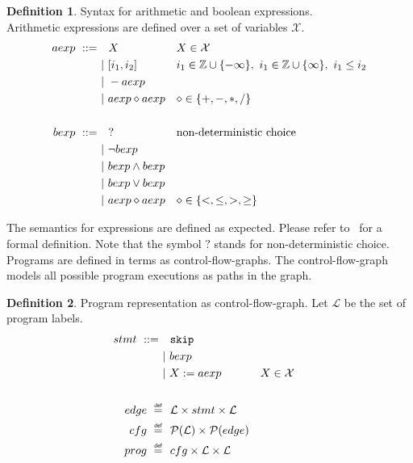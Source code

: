 \documentclass[11pt,a4paper,titlepage]{article}
\theoremstyle{definition}
\newtheorem{definition}{Definition}[section]
\newcommand\eqdef{\mathrel{\overset{\makebox[0pt]{\mbox{\normalfont\tiny\sffamily def}}}{=}}}
\begin{document}
\begin{definition}\label{def:arith_bool_syntax}
    Syntax for arithmetic and boolean expressions. \\
    Arithmetic expressions are defined over a set of variables $\mathcal{X}$.
    \begin{align*}
        \setlength{\jot}{15pt}
        aexp \ ::= \ & \ \ X && X \in \mathcal{X} \\
        &| \  [i_1, i_2] && i_1 \in \mathbb{Z} \cup \{ -\infty \},\ i_1 \in \mathbb{Z} \cup \{\infty \},\ i_1 \leq i_2  \\
        &| \  - aexp \\
        &| \  aexp \diamond aexp && \diamond \in \{ +, -, *, / \}\\
        \\
        bexp \ ::= \ & \ \ ?  && \text{non-deterministic choice} \\
        &| \  \neg bexp \\
        &| \  bexp \land bexp \\
        &| \  bexp \lor bexp \\
        &| \  aexp \diamond aexp && \diamond \in \{<, \leq, >, \geq \}\\
    \end{align*}
\end{definition}

The semantics for expressions are defined as expected. 
Please refer to~\cite{UrbanPhd} for a formal definition. 
Note that the symbol $?$ stands for non-deterministic choice.\\

Programs are defined in terms as control-flow-graphs. The control-flow-graph models all possible program executions as
paths in the graph.

\begin{definition}\label{def:control_flow_graph}
    Program representation as control-flow-graph. 
    Let $\mathcal{L}$ be the set of program labels.
    \begin{align*}
        \setlength{\jot}{15pt}
        stmt \ ::= \ & \ \ \mathtt{skip} \\
        &| \ bexp \\
        &| \ X := aexp  && X \in \mathcal{X} \\
        \\
        edge \ \eqdef & \ \ \mathcal{L} \times stmt \times \mathcal{L}\\
        cfg \ \eqdef & \ \ \mathcal{P}(\mathcal{L}) \times \mathcal{P}(edge)\\
        prog \ \eqdef & \ \ cfg \times \mathcal{L} \times \mathcal{L}
    \end{align*}
\end{definition}
\end{document}
